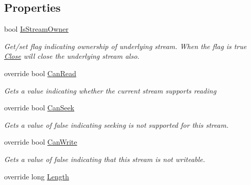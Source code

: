 \subsection*{Properties}
\begin{DoxyCompactItemize}
\item 
bool \hyperlink{class_i_c_sharp_code_1_1_sharp_zip_lib_1_1_l_z_w_1_1_lzw_input_stream_a8aa029f06f66ef308ff556f75422adcc}{Is\+Stream\+Owner}
\begin{DoxyCompactList}\small\item\em Get/set flag indicating ownership of underlying stream. When the flag is true \hyperlink{class_i_c_sharp_code_1_1_sharp_zip_lib_1_1_l_z_w_1_1_lzw_input_stream_a275b4db0e5320b4d40242a97faef3669}{Close} will close the underlying stream also. \end{DoxyCompactList}\item 
override bool \hyperlink{class_i_c_sharp_code_1_1_sharp_zip_lib_1_1_l_z_w_1_1_lzw_input_stream_a1070678d22f6ff1f8f07ffc31e30a5a0}{Can\+Read}
\begin{DoxyCompactList}\small\item\em Gets a value indicating whether the current stream supports reading \end{DoxyCompactList}\item 
override bool \hyperlink{class_i_c_sharp_code_1_1_sharp_zip_lib_1_1_l_z_w_1_1_lzw_input_stream_aaf88c9892cb54ff95a371f3400de7368}{Can\+Seek}
\begin{DoxyCompactList}\small\item\em Gets a value of false indicating seeking is not supported for this stream. \end{DoxyCompactList}\item 
override bool \hyperlink{class_i_c_sharp_code_1_1_sharp_zip_lib_1_1_l_z_w_1_1_lzw_input_stream_a184739b4ac0de3726d56074643890b74}{Can\+Write}
\begin{DoxyCompactList}\small\item\em Gets a value of false indicating that this stream is not writeable. \end{DoxyCompactList}\item 
override long \hyperlink{class_i_c_sharp_code_1_1_sharp_zip_lib_1_1_l_z_w_1_1_lzw_input_stream_a25e7f72f41d74ae687a9cb3e01cb273c}{Length}

\end{DoxyCompactItemize}
